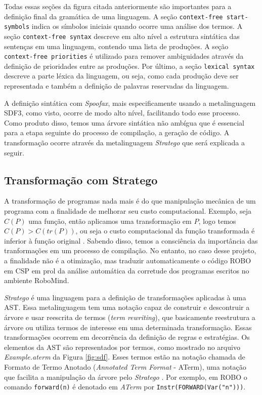 Todas essas seções da figura citada anteriormente são importantes para a definição final da gramática de uma linguagem. A seção \textit{} \texttt{context-free start-symbols} indica os símbolos iniciais quando ocorre uma análise dos termos. A seção \texttt{context-free syntax} descreve em alto nível a estrutura sintática das sentenças em uma linguagem, contendo uma lista de produções. A seção \texttt{context-free priorities} é utilizado para remover ambiguidades através da definição de prioridades entre as produções. Por último, a seção \texttt{lexical syntax} descreve a parte léxica da linguagem, ou seja, como cada produção deve ser representada e também a definição de palavras reservadas da linguagem.

A definição sintática com \textit{Spoofax}, mais especificamente usando a metalinguagem SDF3, como visto, ocorre de modo alto nível, facilitando todo esse processo. Como produto disso, temos uma árvore sintática não ambígua que é essencial para a etapa seguinte do processo de compilação, a geração de código. A transformação ocorre através da metalinguagem \textit{Stratego} que será explicada a seguir.

\subsection{Transformação com Stratego}

A transformação de programas nada mais é do que manipulação mecânica de um programa com a finalidade de melhorar seu custo computacional. Exemplo, seja $C(P)$ uma função, então aplicamos uma transformação em $P$, logo temos $C(P) > C(tr(P))$, ou seja o custo computacional da função transformada é inferior à função original \cite{metaborg}. Sabendo disso, temos a consciência da importância das tranformações em um processo de compilação. No entanto, no caso desse projeto, a finalidade não é a otimização, mas traduzir automaticamente o código ROBO em CSP em prol da análise automática da corretude dos programas escritos no ambiente RoboMind.

\textit{Stratego} é uma linguagem para a definição de transformações aplicadas à uma AST. Essa metalinguagem tem uma notação capaz de construir e descontruir a árvore e usar reescrita de termos (\textit{term rewriting}), que basicamente reestrutura a árvore ou utiliza termos de interesse em uma determinada transformação. Essas transformações ocorrem em decorrência da definição de regras e estratégias. Os elementos da AST são representados por termos, como mostrado no arquivo \textit{Example.aterm} da Figura \ref{fig:sdf}. Esses termos estão na notação chamada de Formato de Termo Anotado (\textit{Annotated Term Format} - ATerm), uma notação que facilita a manipulação da árvore pelo \textit{Stratego}  \cite{metaborg}. Por exemplo, em ROBO o comando \texttt{forward(n)} é denotado em \textit{ATerm} por \texttt{Instr(FORWARD(Var("n")))}.

